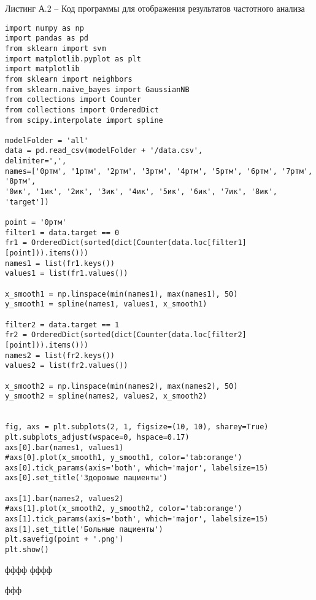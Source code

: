 \vspace{8mm}
\Large
\par
Листинг А.2 -- Код программы для отображения результатов частотного анализа
\vspace{8mm}
\large
\begin{verbatim}
import numpy as np
import pandas as pd
from sklearn import svm
import matplotlib.pyplot as plt
import matplotlib
from sklearn import neighbors
from sklearn.naive_bayes import GaussianNB
from collections import Counter
from collections import OrderedDict
from scipy.interpolate import spline

modelFolder = 'all'
data = pd.read_csv(modelFolder + '/data.csv', 
delimiter=',', 
names=['0ртм', '1ртм', '2ртм', '3ртм', '4ртм', '5ртм', '6ртм', '7ртм', '8ртм', 
'0ик', '1ик', '2ик', '3ик', '4ик', '5ик', '6ик', '7ик', '8ик', 'target'])

point = '0ртм'
filter1 = data.target == 0
fr1 = OrderedDict(sorted(dict(Counter(data.loc[filter1][point])).items()))
names1 = list(fr1.keys())
values1 = list(fr1.values())

x_smooth1 = np.linspace(min(names1), max(names1), 50)
y_smooth1 = spline(names1, values1, x_smooth1)

filter2 = data.target == 1
fr2 = OrderedDict(sorted(dict(Counter(data.loc[filter2][point])).items()))
names2 = list(fr2.keys())
values2 = list(fr2.values())

x_smooth2 = np.linspace(min(names2), max(names2), 50)
y_smooth2 = spline(names2, values2, x_smooth2)


fig, axs = plt.subplots(2, 1, figsize=(10, 10), sharey=True)
plt.subplots_adjust(wspace=0, hspace=0.17)
axs[0].bar(names1, values1)
#axs[0].plot(x_smooth1, y_smooth1, color='tab:orange')
axs[0].tick_params(axis='both', which='major', labelsize=15)
axs[0].set_title('Здоровые пациенты')

axs[1].bar(names2, values2)
#axs[1].plot(x_smooth2, y_smooth2, color='tab:orange')
axs[1].tick_params(axis='both', which='major', labelsize=15)
axs[1].set_title('Больные пациенты')
plt.savefig(point + '.png')
plt.show()
\end{verbatim}
\vspace{8mm}
\Large
\newpage
{}
фффф
\newpage
фффф
\newpage
{}
ффф